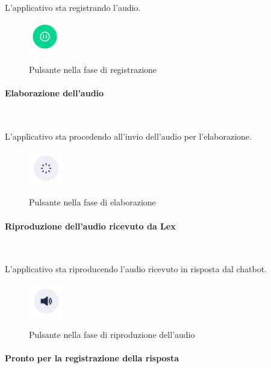 	\noindent L'applicativo sta registrando l'audio. 
	
	\begin{figure}[H]
		\centering
		\includegraphics[width=1.4cm]{immagini/registrazione.png} \\
		\caption{\label{fig:registrazione} Pulsante nella fase di registrazione}
	\end{figure}
	
	
	\paragraph{Elaborazione dell'audio}  ~\smallskip 
	
	\noindent L'applicativo sta procedendo all'invio dell'audio per l'elaborazione. 
	
	\begin{figure}[H]
		\centering
		\includegraphics[width=1.5cm]{immagini/elaborazione.png} \\
		\caption{\label{fig:elaborazione} Pulsante nella fase di elaborazione}
	\end{figure}
	
	
	\paragraph{Riproduzione dell'audio ricevuto da Lex}  ~\smallskip 
	
	\noindent L'applicativo sta riproducendo l'audio ricevuto in risposta dal \gls{chatbot}.
	
	\begin{figure}[H]
		\centering
		\includegraphics[width=1.5cm]{immagini/riproduzione.png} \\
		\caption{\label{fig:riproduzione} Pulsante nella fase di riproduzione dell'audio}
	\end{figure}
	 

	\paragraph{Pronto per la registrazione della risposta}  ~\smallskip 
	

